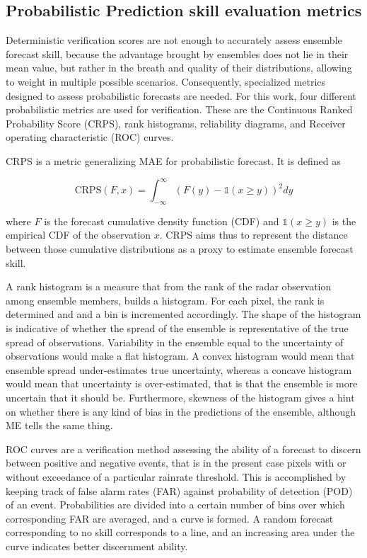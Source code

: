 

\subsection{Probabilistic Prediction skill evaluation metrics}

Deterministic verification scores are not enough to accurately assess ensemble forecast skill, because the advantage brought by ensembles does not lie in their mean value, but rather in the breath and quality of their distributions, allowing to weight in multiple possible scenarios. Consequently, specialized metrics designed to assess probabilistic forecasts are needed. 
For this work, four different probabilistic metrics are used for verification. These are the Continuous Ranked Probability Score (CRPS), rank histograms, reliability diagrams, and Receiver operating characteristic (ROC) curves. 

CRPS is a metric generalizing MAE for probabilistic forecast. It is defined as 

\begin{equation}
	\text{CRPS}(F,x) = \int_{-\infty}^{\infty} (F(y) - \mathds{1}(x \geq y))^2 dy
\end{equation}

where $F$ is the forecast cumulative density function (CDF) and $\mathds{1}(x \geq y)$ is the empirical CDF of the observation $x$. CRPS aims thus to represent the distance between those cumulative distributions as a proxy to estimate ensemble forecast skill. 

A rank histogram is a measure that from the rank of the radar observation among ensemble members, builds a histogram. For each pixel, the rank is determined and and a bin is incremented accordingly. The shape of the histogram is indicative of  whether the spread of the ensemble is representative of the true spread of observations. Variability in the ensemble equal to the uncertainty of observations would make a flat histogram. A convex histogram would mean that ensemble spread under-estimates true uncertainty, whereas a concave histogram would mean that uncertainty is over-estimated, that is that the ensemble is more uncertain that it should be. Furthermore, skewness of the histogram gives a hint on whether there is any kind of bias in the predictions of the ensemble, although ME tells the same thing. 


ROC curves are a verification method assessing the ability of a forecast to discern between positive and negative events, that is in the present case pixels with or without exceedance of a particular rainrate threshold. This is accomplished by keeping track of false alarm rates (FAR) against probability of detection (POD) of an event. Probabilities are divided into a certain number of bins over which corresponding FAR are averaged, and a curve is formed. A random forecast corresponding to no skill corresponds to a line, and an increasing area under the curve indicates better discernment ability. 

